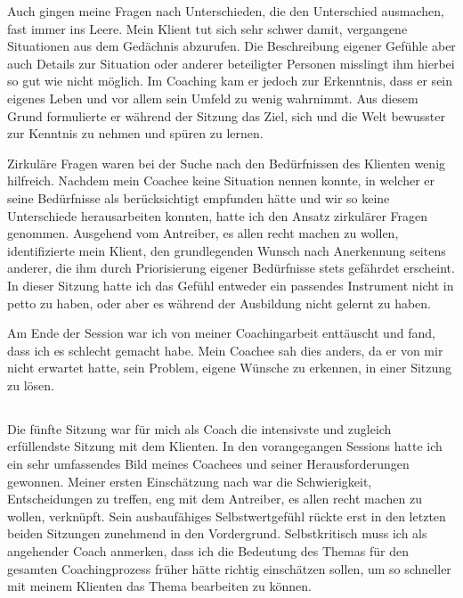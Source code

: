 \documentclass[11pt,a4paper]{article}
\begin{document}
Auch gingen meine Fragen nach Unterschieden, die den Unterschied ausmachen, fast immer ins Leere. Mein Klient tut sich sehr schwer damit, vergangene Situationen aus dem Gedächnis abzurufen. Die Beschreibung eigener Gefühle aber auch Details zur Situation oder anderer beteiligter Personen misslingt ihm hierbei so gut wie nicht möglich. Im Coaching kam er jedoch zur Erkenntnis, dass er sein eigenes Leben und vor allem sein Umfeld zu wenig wahrnimmt. Aus diesem Grund formulierte er während der Sitzung das Ziel, sich und die Welt bewusster zur Kenntnis zu nehmen und spüren zu lernen.

Zirkuläre Fragen waren bei der Suche nach den Bedürfnissen des Klienten wenig hilfreich. Nachdem mein Coachee keine Situation nennen konnte, in welcher er seine Bedürfnisse als berücksichtigt empfunden hätte und wir so keine Unterschiede herausarbeiten konnten, hatte ich den Ansatz zirkulärer Fragen genommen. Ausgehend vom Antreiber, es allen recht machen zu wollen, identifizierte mein Klient, den grundlegenden Wunsch nach Anerkennung seitens anderer, die ihm durch Priorisierung eigener Bedürfnisse stets gefährdet erscheint. In dieser Sitzung hatte ich das Gefühl entweder ein passendes Instrument nicht in petto zu haben, oder aber es während der Ausbildung nicht gelernt zu haben.

Am Ende der Session war ich von meiner Coachingarbeit enttäuscht und fand, dass ich es schlecht gemacht habe. Mein Coachee sah dies anders, da er von mir nicht erwartet hatte, sein Problem, eigene Wünsche zu erkennen, in einer Sitzung zu lösen.





\subsection*{\color{Orange}{Fünfte Sitzung: Erneute Themensammlung}}


Die fünfte Sitzung war für mich als Coach die intensivste und zugleich erfüllendste Sitzung mit dem Klienten. In den vorangegangen Sessions hatte ich ein sehr umfassendes Bild meines Coachees und seiner Herausforderungen gewonnen. Meiner ersten Einschätzung nach war die Schwierigkeit, Entscheidungen zu treffen, eng mit dem Antreiber, es allen recht machen zu wollen, verknüpft. Sein ausbaufähiges Selbstwertgefühl rückte erst in den letzten beiden Sitzungen zunehmend in den Vordergrund. Selbstkritisch muss ich als angehender Coach anmerken, dass ich die Bedeutung des Themas für den gesamten Coachingprozess früher hätte richtig einschätzen sollen, um so schneller mit meinem Klienten das Thema bearbeiten zu können. 
\end{document}
